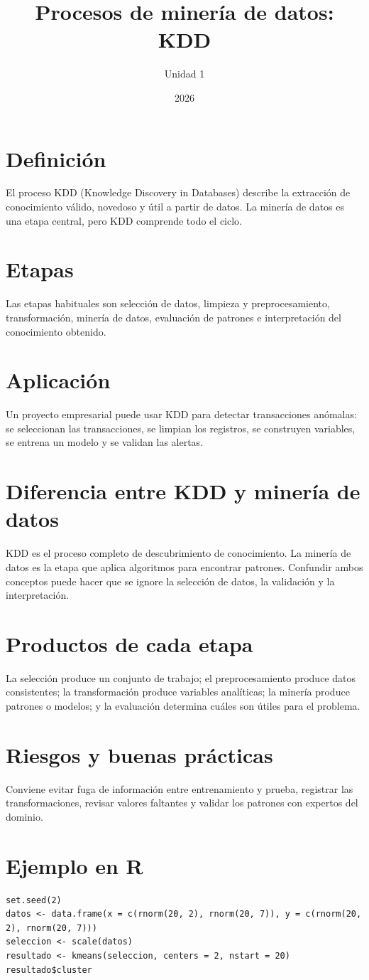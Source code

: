 \documentclass[12pt,a4paper]{article}
\title{Procesos de minería de datos: KDD}
\author{Unidad 1}
\date{2026}
\begin{document}
\maketitle
\section{Definición}
El proceso KDD (Knowledge Discovery in Databases) describe la extracción de conocimiento válido, novedoso y útil a partir de datos. La minería de datos es una etapa central, pero KDD comprende todo el ciclo.
\section{Etapas}
Las etapas habituales son selección de datos, limpieza y preprocesamiento, transformación, minería de datos, evaluación de patrones e interpretación del conocimiento obtenido.
\section{Aplicación}
Un proyecto empresarial puede usar KDD para detectar transacciones anómalas: se seleccionan las transacciones, se limpian los registros, se construyen variables, se entrena un modelo y se validan las alertas.
\section{Diferencia entre KDD y minería de datos}
KDD es el proceso completo de descubrimiento de conocimiento. La minería de datos es la etapa que aplica algoritmos para encontrar patrones. Confundir ambos conceptos puede hacer que se ignore la selección de datos, la validación y la interpretación.
\section{Productos de cada etapa}
La selección produce un conjunto de trabajo; el preprocesamiento produce datos consistentes; la transformación produce variables analíticas; la minería produce patrones o modelos; y la evaluación determina cuáles son útiles para el problema.
\section{Riesgos y buenas prácticas}
Conviene evitar fuga de información entre entrenamiento y prueba, registrar las transformaciones, revisar valores faltantes y validar los patrones con expertos del dominio.
\section{Ejemplo en R}
\begin{lstlisting}
set.seed(2)
datos <- data.frame(x = c(rnorm(20, 2), rnorm(20, 7)), y = c(rnorm(20, 2), rnorm(20, 7)))
seleccion <- scale(datos)
resultado <- kmeans(seleccion, centers = 2, nstart = 20)
resultado$cluster
\end{lstlisting}
\end{document}
